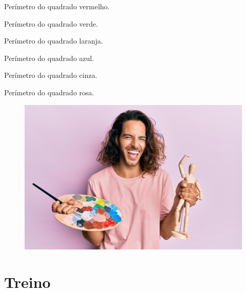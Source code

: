 \begin{escolha}
\item Perímetro do quadrado vermelho.
\item Perímetro do quadrado verde.
\item Perímetro do quadrado laranja.
\item Perímetro do quadrado azul.
\item Perímetro do quadrado cinza.
\item Perímetro do quadrado rosa.
\end{escolha}

\begin{figure}[H]
\centering\includegraphics[width=\textwidth,keepaspectratio]{./imgSAEB_8_MAT/media/image63.png}
\end{figure}

\pagebreak

\section{Treino}

